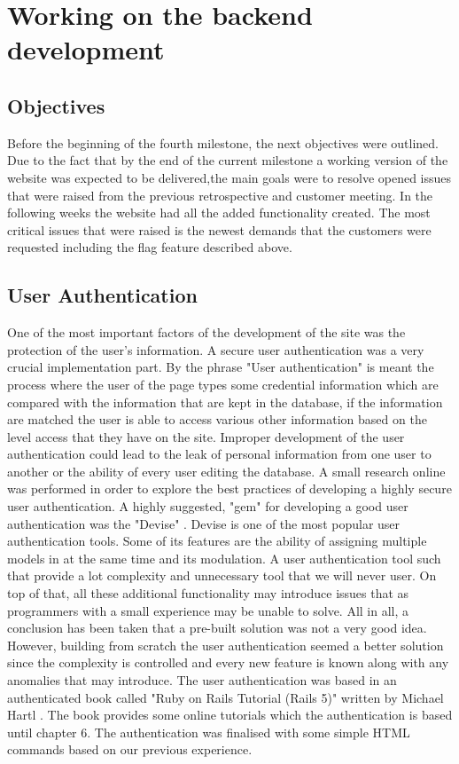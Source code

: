 \documentclass{l3proj}
\begin{document}
\section{Working on the backend development}
\label{sec:backend}

\subsection{Objectives}
\label{objectives}

Before the beginning of the fourth milestone, the next objectives were outlined. Due to the fact that by the end of the current milestone a working version of the website was expected to be delivered,the main goals were to resolve opened issues that were raised from the previous retrospective and customer meeting. In the following weeks the website had all the added functionality created. The most critical issues that were raised is the newest demands that the customers were requested including the flag feature described above.


\subsection{User Authentication}
\label{sec:authentication}

One of the most important factors of the development of the site was the protection of the user's information.  A secure user authentication was a very crucial implementation part. By the phrase "User authentication" \cite{authentication} is meant the process where the user of the page types some credential information which are compared with the information that are kept in the database, if the information are matched the user is able to access various other information based on the level access that they have on the site. Improper development of the user authentication could lead to the leak of personal information from one user to another or the ability of every user editing the database. A small research online was performed in order to explore the best practices of developing a highly secure user authentication. A highly suggested, "gem" for developing a good user authentication was the "Devise" \cite{devise}. Devise is one of the most popular user authentication tools. Some of its features are the ability of assigning multiple models in at the same time and its modulation. A user authentication tool such that provide a lot complexity and unnecessary tool that we will never user. On top of that, all these additional functionality may introduce issues that as programmers with a small experience may be unable to solve. All in all, a conclusion has been taken that a pre-built solution was not a very good idea. However, building from scratch the user authentication seemed a better solution since the complexity is controlled and every new feature is known along with any anomalies that may introduce. The user authentication was based in an authenticated book called "Ruby on Rails Tutorial (Rails 5)" written by Michael Hartl \cite{railsTut}. The book provides some online tutorials which the authentication is based until chapter 6. The authentication was finalised with some simple HTML commands based on our previous experience.
\end{document}
